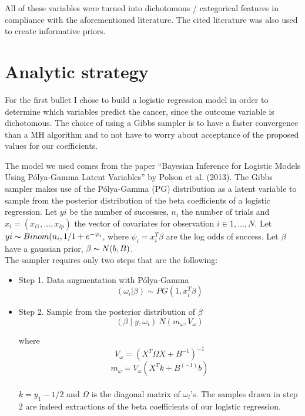 \documentclass[10pt, fullpage, a4paper, titlepage]{article}
\begin{document}
All of these variables were turned into dichotomous / categorical features in compliance with the aforementioned literature. The cited literature was also used to create informative priors.


\section{Analytic strategy}
For the first bullet I chose to build a logistic regression model in order to determine which variables predict the cancer, since the outcome variable is dichotomous. The choice of using a Gibbs sampler is to have a faster convergence than a MH algorithm and to not have to worry about acceptance of the proposed values for our coefficients.

The model we used comes from the paper “Bayesian Inference for Logistic Models Using Pólya-Gamma Latent Variables” by Polson et al. (2013). The Gibbs sampler makes use of the Pólya-Gamma (PG) distribution as a latent variable to sample from the posterior distribution of the beta coefficients of a logistic regression. 
Let $yi$ be the number of successes, $n_i$ the number of trials and 
$x_i = (x_{i1}, ..., x_{ip})$ the vector of covariates for observation $i \in {1, ..., N}$. Let  $yi \thicksim Binom (n_i,1 / {1 +e^{-\psi_i} }$, where $\psi_i=x_i^T \beta $ are the log odds of success. Let $\beta$ have a gaussian prior, $\beta \thicksim N (b, B)$.
\\ The sampler requires only two steps that are the following: 
\begin{itemize}
    \item Step 1. Data augmentation with Pólya-Gamma
    \begin{equation*}
\label{eq1}
(\omega_i|\beta) \sim PG(1,x_i^T\beta)
\end{equation*}
    \item Step 2. Sample from the posterior distribution of $\beta$
     \begin{equation*}
\label{eq2}
(\beta \mid y, \omega_i )  ~ N(m_\omega,V_\omega)
\end{equation*}
 
where
\begin{equation*}
\label{eq3}
V_\omega=(X^T \Omega X+B^{-1} )^{-1}
\end{equation*}
\begin{equation*}
\label{eq4}
m_\omega=V_\omega  (X^T k+B^(-1) b) 
\end{equation*}
\\
$k=y_1-1/2$ and $\Omega$ is the diagonal matrix of $\omega_l$’s. 
The samples drawn in step 2 are indeed extractions of the beta coefficients of our logistic regression. 

\end{itemize}
\end{document}
